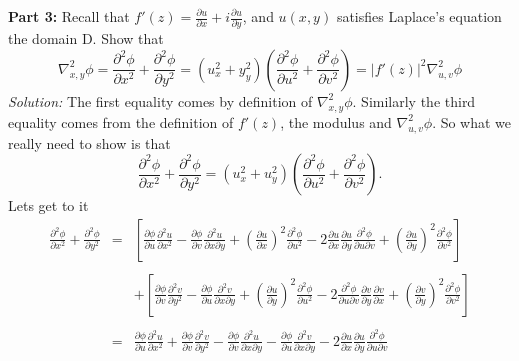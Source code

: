 \documentclass[10pt]{amsart}
\theoremstyle{nonumberplain}
\begin{document}
\begin{enumerate}[label={\bf {\arabic*}:}]
\noindent
\textbf{Part 3:}  Recall that $f'(z) = \frac{\partial u }{\partial x} + i\frac{\partial u}{\partial y}$, and $u(x, y)$ satisfies Laplace's equation the domain D.
Show that
$$
\nabla_{x, y}^2 \phi = 
\frac{\partial^2\phi}{\partial x^2} + \frac{\partial^2 \phi }{\partial y^2} = 
\left(u_x^2 + y_y^2\right) \left(\frac{\partial^2\phi}{\partial u^2} + \frac{\partial^2 \phi }{\partial v^2}\right) =
\left| f'(z)\right|^2 \nabla_{u, v}^2 \phi
$$
\textit{Solution:}
The first equality comes by definition of $\nabla_{x, y}^2 \phi$.
Similarly the third equality comes from the definition of $f'(z)$, the modulus and $\nabla_{u, v}^2 \phi$.
So what we really need to show is that
$$
\frac{\partial^2\phi}{\partial x^2} + \frac{\partial^2 \phi }{\partial y^2} = 
\left(u_x^2 + u_y^2\right) \left(\frac{\partial^2\phi}{\partial u^2} + \frac{\partial^2 \phi }{\partial v^2}\right).
$$
Lets get to it
\begin{eqnarray*}
\frac{\partial^2\phi}{\partial x^2} + \frac{\partial^2 \phi }{\partial y^2} &=& \left[\frac{\partial\phi}{\partial u} \frac{\partial^2 u}{\partial x^2}
													- \frac{\partial\phi}{\partial v} \frac{\partial^2 u}{\partial x \partial y}
													+  \left(\frac{\partial u}{\partial x}\right)^2 \frac{\partial^2 \phi}{\partial u^2}
													-2 \frac{\partial u}{\partial x} \frac{\partial u}{\partial y} \frac{\partial^2 \phi}{\partial u \partial v}
													+  \left(\frac{\partial u}{\partial y}\right)^2\frac{\partial^2 \phi}{\partial v^2} \right] \\ \\
												  && + \left[\frac{\partial\phi}{\partial v} \frac{\partial^2 v}{\partial y^2} 
													- \frac{\partial\phi}{\partial u} \frac{\partial^2 v}{\partial x \partial y}
													+ \left(\frac{\partial u}{\partial y}\right)^2 \frac{\partial^2 \phi}{\partial u^2}
													-2 \frac{\partial^2 \phi}{\partial u \partial v} \frac{\partial v}{\partial y} \frac{\partial v}{\partial x}
													+ \left(\frac{\partial v}{\partial y}\right)^2 \frac{\partial^2 \phi}{\partial v^2} \right]\\ \\
												   &=& \frac{\partial\phi}{\partial u} \frac{\partial^2 u}{\partial x^2}
													+ \frac{\partial\phi}{\partial v} \frac{\partial^2 v}{\partial y^2} 
													- \frac{\partial\phi}{\partial v} \frac{\partial^2 u}{\partial x \partial y}
													- \frac{\partial\phi}{\partial u} \frac{\partial^2 v}{\partial x \partial y}
													-2 \frac{\partial u}{\partial x} \frac{\partial u}{\partial y} \frac{\partial^2 \phi}{\partial u \partial v}

\end{eqnarray*}
\end{enumerate}
\end{document}

